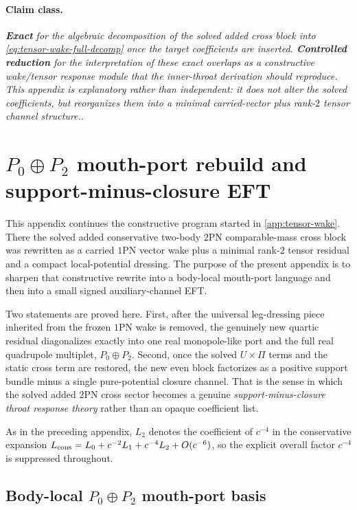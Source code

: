 \documentclass[11pt]{article}
\newcommand{\OnePN}{\mathrm{1PN}}
\newcommand{\TwoPN}{\mathrm{2PN}}
\newcommand{\Exact}{\textbf{Exact}}
\newcommand{\Controlled}{\textbf{Controlled reduction}}
\newcommand{\claimclass}[1]{\paragraph{Claim class.}\emph{#1.}}
\begin{document}
\claimclass{\Exact{} for the algebraic decomposition of the solved added cross block into
\cref{eq:tensor-wake-full-decomp} once the target coefficients are inserted.
\Controlled{} for the interpretation of these exact overlaps as a constructive wake/tensor
response module that the inner-throat derivation should reproduce.
This appendix is explanatory rather than independent: it does not alter the solved
coefficients, but reorganizes them into a minimal carried-vector plus rank-\(2\) tensor
channel structure.}

\section{\texorpdfstring{$P_0\oplus P_2$}{P0⊕P2} mouth-port rebuild and support-minus-closure EFT}
\label{app:mouth-port}

This appendix continues the constructive program started in
\cref{app:tensor-wake}.  There the solved added conservative two-body \(\TwoPN\)
comparable-mass cross block was rewritten as a carried \(\OnePN\) vector wake plus a
minimal rank-\(2\) tensor residual and a compact local-potential dressing.
The purpose of the present appendix is to sharpen that constructive rewrite into a
body-local mouth-port language and then into a small signed auxiliary-channel EFT.

Two statements are proved here.
First, after the universal leg-dressing piece inherited from the frozen
\(\OnePN\) wake is removed, the genuinely new quartic residual diagonalizes exactly
into one real monopole-like port and the full real quadrupole multiplet,
\(P_0\oplus P_2\).
Second, once the solved \(U\times \Pi\) terms and the static cross term are restored,
the new even block factorizes as a positive support bundle minus a single pure-potential
closure channel.
That is the sense in which the solved added \(\TwoPN\) cross sector becomes a genuine
\emph{support-minus-closure throat response theory} rather than an opaque coefficient list.

As in the preceding appendix, \(L_2\) denotes the coefficient of \(c^{-4}\) in the
conservative expansion
\(L_{\rm cons}=L_0+c^{-2}L_1+c^{-4}L_2+O(c^{-6})\),
so the explicit overall factor \(c^{-4}\) is suppressed throughout.

\subsection{Body-local \texorpdfstring{$P_0\oplus P_2$}{P0⊕P2} mouth-port basis}
\label{app:mouth-port-basis}
\end{document}
